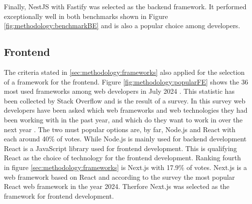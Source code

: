 Finally, NestJS \cite{methodology:nestjs} with Fastify was selected as the backend framework. It performed exceptionally well in both benchmarks shown in Figure \ref{fig:methodology:benchmarkBE} and is also a popular choice among developers.

\subsection{Frontend}
\label{subsec:methodology:frameworks:frontend}
The criteria stated in \ref{sec:methodology:frameworks} also applied for the selection of a framework for the frontend. Figure \ref{fig:methodology:popularFE} shows the 36 most used frameworks among web developers in July 2024 \cite{frontend:popularity}. This statistic has been collected by Stack Overflow and is the result of a survey. In this survey web developers have been asked which web frameworks and web technologies they had been working with in the past year, and which do they want to work in over the next year \cite{frontend:popularity}. The two must popular options are, by far, Node.js and React with each around 40\% of votes. While Node.js is mainly used for backend development React is a JavaScript library used for frontend development. This is qualifying React as the choice of technology for the frontend development. Ranking fourth in figure \ref{sec:methodology:frameworks} is Next.js with 17.9\% of votes. Next.js is a web framework based on React \cite{methodology:nextjs} and according to the survey the most popular React web framework in the year 2024. Therfore Next.js was selected as the framework for frontend development.
